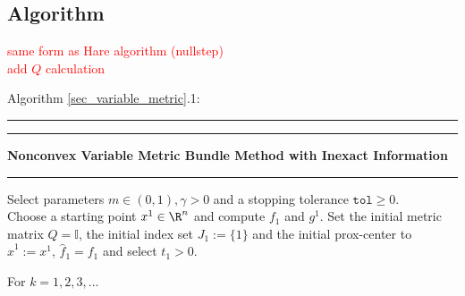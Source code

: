 










 

\subsection{Algorithm}

\textcolor{red}{same form as Hare algorithm (nullstep)\\
add \(Q\) calculation}

\begin{minipage}\linewidth
Algorithm \ref{sec_variable_metric}.1:
\vspace{1em}
\hrule  \vspace{0.4ex} \hrule
\vspace{1ex}
\textbf{Nonconvex Variable Metric Bundle Method with Inexact Information}
\vspace{1ex}
\hrule
\vspace{1ex}
Select parameters \( m \in (0,1), \gamma > 0 \) and a stopping tolerance \( \mathtt{tol} \geq 0\). \\
Choose a starting point \(x^1 \in \R^n\) and compute \(f_1\) and \(g^1\). Set the initial metric matrix \(Q = \mathbb{I}\), the initial index set \(J_1:=\{1\}\) and the initial prox-center to \(\hat{x}^1 := x^1\), \(\hat{f}_1 = f_1\) and select \(t_1 > 0\).
\end{minipage}
For \(k = 1,2,3,  \dotsc \)   

